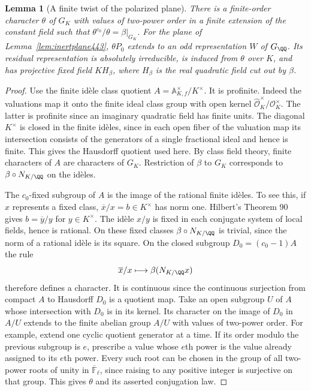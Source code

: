 \documentclass[a4paper,11pt]{article}
\newtheorem{lemma}[proposition]{Lemma}
\theoremstyle{definition}
\theoremstyle{remark}
\numberwithin{equation}{section}
\begin{document}
\begin{lemma}[A finite twist of the polarized plane]\leavevmode
\label{lem:quadtwist443}
There is a finite-order character \(\theta\) of \(G_K\) with
values of two-power order in a finite extension of the constant
field such that
\(\theta^{c_0}/\theta=\beta|_{G_K}\).
For the plane of Lemma~\ref{lem:inertplane443},
\(\theta P_0\) extends to an odd representation \(W\) of
\(G_\QQ\). Its residual representation is absolutely irreducible,
is induced from \(\theta\) over \(K\), and has projective fixed
field \(KH_\beta\), where \(H_\beta\) is the real quadratic
field cut out by \(\beta\).
\end{lemma}
\begin{proof}
Use the finite id\`ele class quotient
\(A=\mathbb A_{K,f}^\times/K^\times\). It is profinite.
Indeed the valuations map it onto the finite ideal class group
with open kernel \(\widehat{\mathcal O}_K^\times/\mathcal O_K^\times\).
The latter is profinite since an imaginary quadratic field has
finite units. The diagonal \(K^\times\) is closed in the finite
id\`eles, since in each open fiber of the valuation map its
intersection consists of the generators of a single fractional
ideal and hence is finite. This gives the Hausdorff quotient
used here. By class field theory, finite characters of \(A\)
are characters of \(G_K\). Restriction of \(\beta\) to \(G_K\)
corresponds to \(\beta\circ N_{K/\QQ}\) on the id\`eles.

The \(c_0\)-fixed subgroup of \(A\) is the image of the rational
finite id\`eles. To see this, if \(x\) represents a fixed class,
\(\overline x/x=b\in K^\times\) has norm one. Hilbert's
Theorem 90 gives \(b=\overline y/y\) for \(y\in K^\times\).
The id\`ele \(x/y\) is fixed in each conjugate system of local
fields, hence is rational. On these fixed classes
\(\beta\circ N_{K/\QQ}\) is trivial, since the norm of a rational
id\`ele is its square. On the closed subgroup
\(D_0=(c_0-1)A\) the rule
\[
        \overline x/x\longmapsto \beta(N_{K/\QQ}x)
\]
therefore defines a character. It is continuous since the
continuous surjection from compact \(A\) to Hausdorff \(D_0\)
is a quotient map. Take an open subgroup \(U\) of \(A\) whose
intersection with \(D_0\) is in its kernel. Its character on the
image of \(D_0\) in \(A/U\) extends to the finite abelian group
\(A/U\) with values of two-power order. For example, extend
one cyclic quotient generator at a time. If its order modulo
the previous subgroup is \(e\), prescribe a value whose \(e\)th
power is the value already assigned to its \(e\)th power.
Every such root can be chosen in the group of all two-power
roots of unity in \(\overline{\mathbb F}_\ell\), since raising to
any positive integer is surjective on that group. This gives
\(\theta\) and its asserted conjugation law.


\end{proof}
\end{document}
